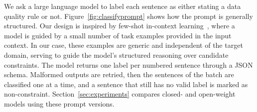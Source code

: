 We ask a large language model to label each sentence as either stating a data quality rule or not. Figure~\ref{fig:classifyprompt} shows how the prompt is generally structured. 
Our design is inspired by few-shot in-context learning~\cite{brown2020language}, where a model is guided by a small number of task examples provided in the input context. In our case, these examples are generic and independent of the target domain, serving to guide the model’s structured reasoning over candidate constraints.
The model returns one label per numbered sentence through a JSON schema. Malformed outputs are retried, then the sentences of the batch are classified one at a time, and a sentence that still has no valid label is marked as non-constraint. Section~\ref{sec:experiments} compares closed- and open-weight models using these prompt versions.


